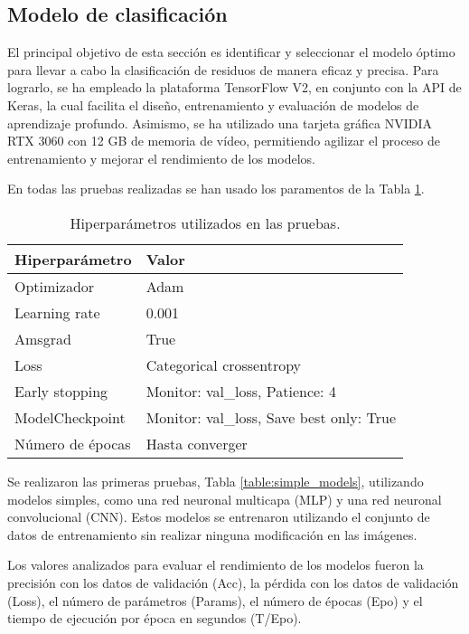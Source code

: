 \documentclass[10pt,a4paper,twocolumn,twoside]{article}
\begin{document}
\subsection{Modelo de clasificación}

El principal objetivo de esta sección es identificar y seleccionar el modelo óptimo para llevar a cabo la clasificación de residuos de manera eficaz y precisa. Para lograrlo, se ha empleado la plataforma TensorFlow V2, en conjunto con la API de Keras, la cual facilita el diseño, entrenamiento y evaluación de modelos de aprendizaje profundo. Asimismo, se ha utilizado una tarjeta gráfica NVIDIA RTX 3060 con 12 GB de memoria de vídeo, permitiendo agilizar el proceso de entrenamiento y mejorar el rendimiento de los modelos.

En todas las pruebas realizadas se han usado los paramentos de la Tabla \ref{table:hyperparameters}.

\begin{table}[h]
  \centering
  \begin{tabular}{|l|l|}
  \hline
  \textbf{Hiperparámetro} & \textbf{Valor} \\ \hline
  Optimizador & Adam \\ \hline
  Learning rate & 0.001 \\ \hline
  Amsgrad & True \\ \hline
  Loss & Categorical crossentropy \\ \hline
  Early stopping & Monitor: val\_loss, Patience: 4 \\ \hline
  ModelCheckpoint & Monitor: val\_loss, Save best only: True \\ \hline
  Número de épocas & Hasta converger \\ \hline
  \end{tabular}
  \caption{Hiperparámetros utilizados en las pruebas.}
  \label{table:hyperparameters}
\end{table}

Se realizaron las primeras pruebas, Tabla \ref{table:simple_models}, utilizando modelos simples, como una red neuronal multicapa (MLP) y una red neuronal convolucional (CNN). Estos modelos se entrenaron utilizando el conjunto de datos de entrenamiento sin realizar ninguna modificación en las imágenes.

Los valores analizados para evaluar el rendimiento de los modelos fueron la precisión con los datos de validación (Acc), la pérdida con los datos de validación (Loss), el número de parámetros (Params), el número de épocas (Epo) y el tiempo de ejecución por época en segundos (T/Epo).
\end{document}
